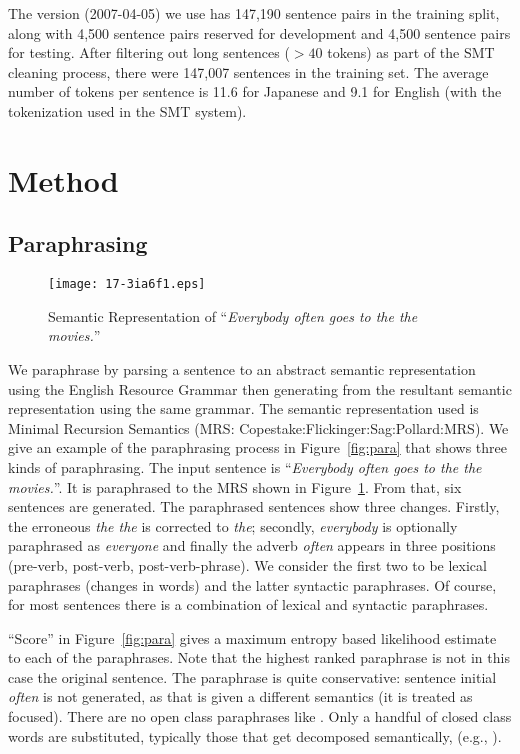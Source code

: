 \documentclass[english]{jnlp_1.4}
\newcommand{\para}[2]{}
\newcommand{\citep}{}
\begin{document}
The version (2007-04-05) we use has 147,190 sentence pairs in the
training split, along with 4,500 sentence pairs reserved for
development and 4,500 sentence pairs for testing. After filtering out
long sentences ($> 40$ tokens) as part of the SMT cleaning process,
there were 147,007 sentences in the training set. The average number
of tokens per sentence is 11.6 for Japanese and 9.1 for English (with
the tokenization used in the SMT system).



\section{Method}

\subsection{Paraphrasing}

\begin{figure}[t]
\begin{center}
\texttt{[image: 17-3ia6f1.eps]}
\end{center}
\caption{Semantic Representation of ``\textit{Everybody often goes to
    the the movies.}''}
\label{fig:mrs}
\end{figure}

We paraphrase by parsing a sentence to an abstract semantic
representation using the English Resource Grammar then generating from
the resultant semantic representation using the same grammar. The
semantic representation used is Minimal Recursion Semantics (MRS:
\citep{Copestake:Flickinger:Sag:Pollard:MRS}). We give an example of
the paraphrasing process in Figure~\ref{fig:para} that shows three
kinds of paraphrasing. The input sentence is ``\textit{Everybody often
goes to the the movies.}''. It is paraphrased to the MRS shown in
Figure~\ref{fig:mrs}. From that, six sentences are generated. The
paraphrased sentences show three changes. Firstly, the erroneous
\textit{the the} is corrected to \textit{the}; secondly,
\textit{everybody} is optionally paraphrased as \textit{everyone} and
finally the adverb \textit{often} appears in three positions
(pre-verb, post-verb, post-verb-phrase). We consider the first two to
be lexical paraphrases (changes in words) and the latter syntactic
paraphrases. Of course, for most sentences there is a combination of
lexical and syntactic paraphrases.

``Score'' in Figure~\ref{fig:para} gives a maximum entropy based
likelihood estimate to each of the paraphrases. Note that the highest
ranked paraphrase is not in this case the original sentence. The
paraphrase is quite conservative: sentence initial \textit{often} is
not generated, as that is given a different semantics (it is treated
as focused). There are no open class paraphrases like
\para{film}{movie}. Only a handful of closed class words are
substituted, typically those that get decomposed semantically, (e.g.,
\para{everybody}{every(x),person(x)}).
\end{document}
